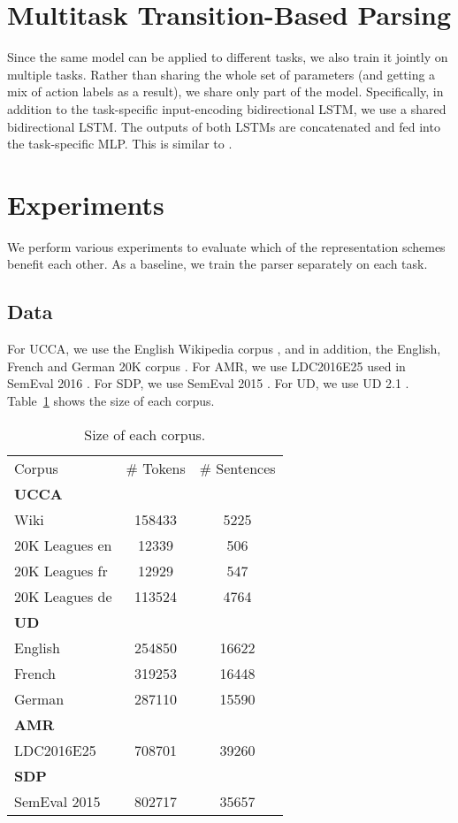 \documentclass[11pt,a4paper]{article}
\begin{document}
\section{Multitask Transition-Based Parsing}\label{sec:multitask}

Since the same model can be applied to different tasks, we also train it jointly on multiple tasks.
Rather than sharing the whole set of parameters (and getting a mix of action labels as a result),
we share only part of the model.
Specifically, in addition to the task-specific input-encoding bidirectional LSTM,
we use a shared bidirectional LSTM. The outputs of both LSTMs are concatenated and
fed into the task-specific MLP.
This is similar to \citet{P17-1186}.




\section{Experiments}\label{sec:experiments}

We perform various experiments to evaluate which of the representation schemes benefit each other.
As a baseline, we train the parser separately on each task.

\subsection{Data}\label{sec:data}

For UCCA, we use the English Wikipedia corpus \cite{abend2013universal},
and in addition, the English, French and German 20K corpus \cite{sulem2015conceptual}.
For AMR, we use LDC2016E25 used in SemEval 2016 \cite{may2017semeval}.
For SDP, we use SemEval 2015 \cite{oepen2015semeval}.
For UD, we use UD 2.1 \cite{silveira14gold,zeman2017conll,11234/1-2515}.
Table~\ref{tab:corpora} shows the size of each corpus.

\begin{table}
\begin{tabular}{lcc}
Corpus & \# Tokens & \# Sentences \\
\textbf{UCCA} \\
Wiki & 158433 & 5225 \\
20K Leagues en & 12339 & 506 \\
20K Leagues fr & 12929 & 547 \\
20K Leagues de & 113524 & 4764 \\
\textbf{UD} \\
English & 254850 & 16622 \\
French & 319253 & 16448 \\
German & 287110 & 15590 \\
\textbf{AMR} \\
LDC2016E25 & 708701 & 39260 \\
\textbf{SDP} \\
SemEval 2015 & 802717 & 35657 \\
\end{tabular}
\caption{Size of each corpus.\label{tab:corpora}}
\end{table}
\end{document}
